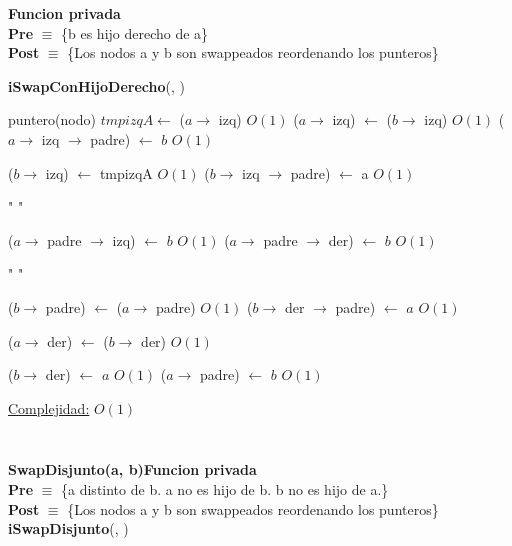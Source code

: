 \begin{Algoritmos}
$ $\newline


$ $\newline

\textbf{Funcion privada}\\
\textbf{Pre} $\equiv$ \{b es hijo derecho de a\}\\%
\textbf{Post} $\equiv$ \{Los nodos a y b son swappeados reordenando los punteros\}%
\begin{algorithm}[H]
{\textbf{iSwapConHijoDerecho}(, )}
\begin{algorithmic}[1]

    \State puntero(nodo) $tmpizqA \gets$ ($a \to$ izq) \Comment $O(1)$
    \State ($a \to$ izq) $\gets$ ($b \to$ izq)  \Comment $O(1)$
        \State ($a \to$ izq $\to$ padre) $\gets$ $b$ \Comment $O(1)$
    \EndIf

    \State ($b \to$ izq) $\gets$ tmpizqA  \Comment $O(1)$
        \State ($b \to$ izq $\to$ padre) $\gets$ a  \Comment $O(1)$
    \EndIf
    
    \State " "

        \State ($a \to$ padre $\to$ izq) $\gets$ $b$ \Comment $O(1)$
    \Else {}
        \State ($a \to$ padre $\to$ der) $\gets$ $b$ \Comment $O(1)$
    \EndIf
    \EndIf
    
    \State " "

    \State ($b \to$ padre) $\gets$ ($a \to$ padre) \Comment $O(1)$
        \State ($b \to$ der $\to$ padre) $\gets$ $a$ \Comment $O(1)$
    \EndIf
    
    \State ($a \to$ der) $\gets$ ($b \to$ der) \Comment $O(1)$
    
    \State ($b \to$ der) $\gets$ $a$ \Comment $O(1)$
    \State ($a \to$ padre) $\gets$ $b$ \Comment $O(1)$

    \medskip
    \Statex \underline{Complejidad:} $O(1)$

\end{algorithmic}
\end{algorithm}

$ $\newline


$ $\newline

\begin{algorithm}[H]
\textbf{SwapDisjunto(a, b)\hspace*{1cm}Funcion privada}\\
\textbf{Pre} $\equiv$ \{a distinto de b. a no es hijo de b. b no es hijo de a.\}\\
\textbf{Post} $\equiv$ \{Los nodos a y b son swappeados reordenando los punteros\}\\
{\textbf{iSwapDisjunto}(, )}
\begin{algorithmic}[1]


\end{algorithmic}
\end{algorithm}
\end{Algoritmos}
